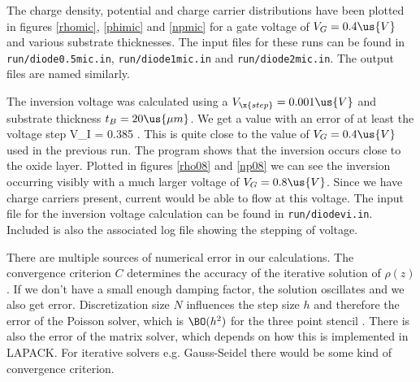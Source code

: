 \documentclass[10pt]{article}
\begin{document}
The charge density, potential and charge carrier distributions have been plotted in figures \ref{rhomic}, \ref{phimic} and \ref{npmic} for a gate voltage of $V_G = 0.4 \us{V}$ and various substrate thicknesses. The input files for these runs can be found in \verb|run/diode0.5mic.in|, \verb|run/diode1mic.in| and \verb|run/diode2mic.in|. The output files are named similarly.

The inversion voltage was calculated using a $V_\x{step} = 0.001 \us{V}$ and substrate thickness $t_B = 20 \us{\mu m}$. We get a value with an error of at least the voltage step
\bna
V_I = 0.385   .
\ena
This is quite close to the value of $V_G = 0.4\us{V}$ used in the previous run. The program shows that the inversion occurs close to the oxide layer. Plotted in figures \ref{rho08} and \ref{np08} we can see the inversion occurring visibly with a much larger voltage of $V_G = 0.8 \us{V}$. Since we have charge carriers present, current would be able to flow at this voltage. The input file for the inversion voltage calculation can be found in \verb|run/diodevi.in|. Included is also the associated log file showing the stepping of voltage.

There are multiple sources of numerical error in our calculations. The convergence criterion $C$ determines the accuracy of the iterative solution of $\rho(z)$. If we don't have a small enough damping factor, the solution oscillates and we also get error. Discretization size $N$ influences the step size $h$ and therefore the error of the Poisson solver, which is $\BO(h^2)$ for the three point stencil \cite{che}. There is also the error of the matrix solver, which depends on how this is implemented in LAPACK. For iterative solvers e.g. Gauss-Seidel there would be some kind of convergence criterion.

\end{document}
